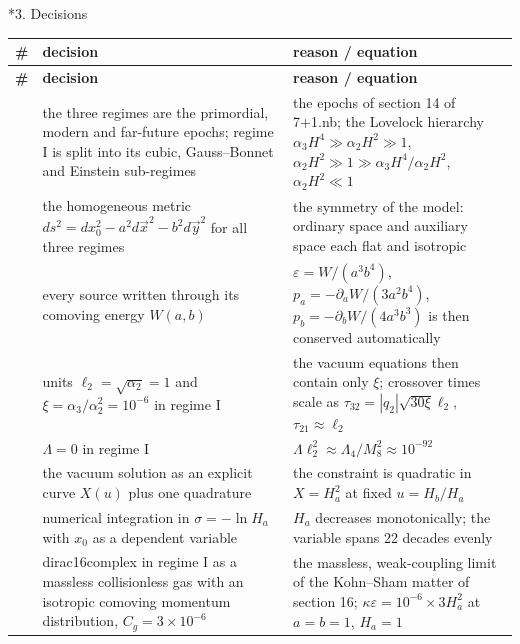 \documentclass[10pt,a4paper]{article}
\makeatletter
\renewcommand\section{\@startsection{section}{1}{\z@}{-3.5ex \@plus -1ex \@minus -.2ex}{2.3ex \@plus.2ex}{\normalfont\Large\bfseries\raggedright}}
\makeatother
\begin{document}
\section*{3. Decisions}
{\footnotesize
\begin{longtable}{>{\raggedright\arraybackslash}p{}>{\raggedright\arraybackslash}p{}>{\raggedright\arraybackslash}p{}}
\toprule
\textbf{\#} & \textbf{decision} & \textbf{reason / equation} \\
\midrule\endfirsthead
\toprule
\textbf{\#} & \textbf{decision} & \textbf{reason / equation} \\
\midrule\endhead
\endfoot
\bottomrule\endlastfoot
1 & the three regimes are the primordial, modern and far-future epochs; regime I is split into its cubic, Gauss–Bonnet and Einstein sub-regimes & the epochs of section 14 of 7+1.nb; the Lovelock hierarchy $\alpha_3H^4\gg\alpha_2H^2\gg1$, $\alpha_2H^2\gg1\gg\alpha_3H^4/\alpha_2H^2$, $\alpha_2H^2\ll1$ \\
2 & the homogeneous metric $ds^2=dx_0^2-a^2d\vec x^2-b^2d\vec y^2$ for all three regimes & the symmetry of the model: ordinary space and auxiliary space each flat and isotropic \\
3 & every source written through its comoving energy $W(a,b)$ & $\varepsilon=W/(a^3b^4)$, $p_a=-\partial_aW/(3a^2b^4)$, $p_b=-\partial_bW/(4a^3b^3)$ is then conserved automatically \\
4 & units $\ell_2=\sqrt{\alpha_2}=1$ and $\xi=\alpha_3/\alpha_2^2=10^{-6}$ in regime I & the vacuum equations then contain only $\xi$; crossover times scale as $\tau_{32}=|q_2|\sqrt{30\xi}\ell_2$, $\tau_{21}\approx\ell_2$ \\
5 & $\Lambda=0$ in regime I & $\Lambda\ell_2^2\approx\Lambda_4/M_8^2\approx10^{-92}$ \\
6 & the vacuum solution as an explicit curve $X(u)$ plus one quadrature & the constraint is quadratic in $X=H_a^2$ at fixed $u=H_b/H_a$ \\
7 & numerical integration in $\sigma=-\ln H_a$ with $x_0$ as a dependent variable & $H_a$ decreases monotonically; the variable spans 22 decades evenly \\
8 & dirac16complex in regime I as a massless collisionless gas with an isotropic comoving momentum distribution, $C_g=3\times10^{-6}$ & the massless, weak-coupling limit of the Kohn–Sham matter of section 16; $\kappa\varepsilon=10^{-6}\times3H_a^2$ at $a=b=1$, $H_a=1$ \\

\end{longtable}}
\end{document}
